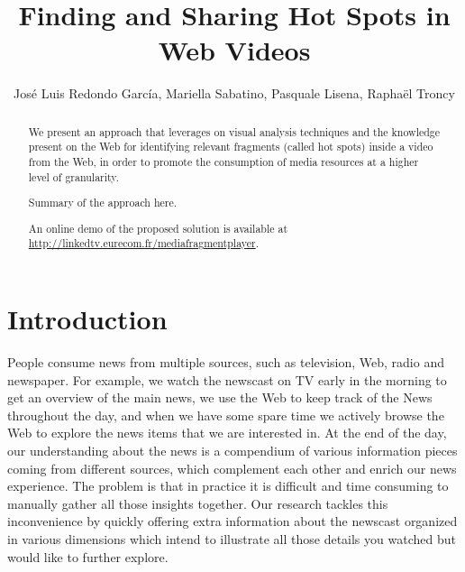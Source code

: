 \documentclass{llncs}
\begin{document}
\frontmatter          %
\pagestyle{headings}  %
\mainmatter              %

\title{Finding and Sharing Hot Spots in Web Videos}
\author{Jos\'e Luis Redondo Garc\'ia, Mariella Sabatino, Pasquale Lisena, Rapha\"el Troncy}


\maketitle              %


\begin{abstract}
We present an approach that leverages on visual analysis techniques and the knowledge present on the Web for identifying relevant fragments (called hot spots) inside a video from the Web, in order to promote the consumption of media resources at a higher level of granularity. 

Summary of the approach here.

An online demo of the proposed solution is available at \url{http://linkedtv.eurecom.fr/mediafragmentplayer}.

\end{abstract}


\section{Introduction}

People consume news from multiple sources, such as television, Web, radio and newspaper. For example, we watch the newscast on TV early in the morning to get an overview of the main news, we use the Web to keep track of the News throughout the day, and when we have some spare time we actively browse the Web to explore the news items that we are interested in. At the end of the day, our understanding about the news is a compendium of various information pieces coming from different sources, which complement each other and enrich our news experience. The problem is that in practice it is difficult and time consuming to manually gather all those insights together. Our research tackles this inconvenience by quickly offering extra information about the newscast organized in various dimensions which intend to illustrate all those details you watched but would like to further explore. 
\end{document}
